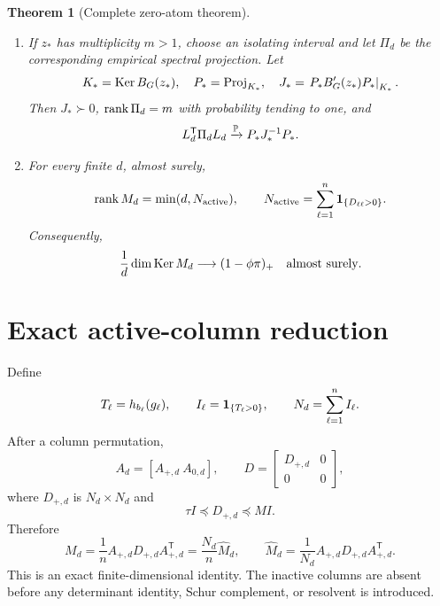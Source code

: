 \documentclass[
  aps,
  prl,
  10pt,
  onecolumn,
  longbibliography,
  nofootinbib
]{revtex4-2}
\newtheorem{theorem}{Theorem}
\theoremstyle{remark}
\begin{document}
\begin{theorem}[Complete zero-atom theorem]
\begin{enumerate}
\item If $z_*$ has multiplicity $m>1$, choose an isolating interval and let $\Pi_d$ be the corresponding empirical spectral projection. Let
\begin{equation}
K_*=\operatorname{Ker} B_G(z_*),\quad P_*=\operatorname{Proj}_{K_*},\quad
J_*=\left.P_*B_G'(z_*)P_*\right|_{K_*}.
\end{equation}
Then $J_*\succ0$, $\operatorname{rank}\Pi_d=m$ with probability tending to one, and
\begin{equation}
L_d^{\mathsf T}\Pi_dL_d
\xrightarrow{\mathbb{P}}P_*J_*^{-1}P_*.
\label{S:projection}
\end{equation}

\item For every finite $d$, almost surely,
\begin{equation}
\operatorname{rank} M_d=\min(d,N_{\mathrm{active}}),\qquad
N_{\mathrm{active}}=\sum_{\ell=1}^n\mathbf{1}_{\{D_{\ell\ell}>0\}}.
\label{S:rank}
\end{equation}
Consequently,
\begin{equation}
\frac1d\dim\operatorname{Ker} M_d\longrightarrow(1-\phi\pi)_+
\quad\text{almost surely}.
\label{S:nullity}
\end{equation}
\end{enumerate}
\end{theorem}

\section{Exact active-column reduction}

Define
\begin{equation}
T_\ell=h_{b_\ell}(g_\ell),\qquad
I_\ell=\mathbf{1}_{\{T_\ell>0\}},\qquad
N_d=\sum_{\ell=1}^nI_\ell .
\end{equation}
After a column permutation,
\begin{equation}
A_d=[A_{+,d}\ A_{0,d}],\qquad
D=\begin{bmatrix}D_{+,d}&0\\0&0\end{bmatrix},
\end{equation}
where $D_{+,d}$ is $N_d\times N_d$ and
\begin{equation}
\tau I\preceq D_{+,d}\preceq MI.
\end{equation}
Therefore
\begin{equation}
M_d
=\frac1nA_{+,d}D_{+,d}A_{+,d}^{\mathsf T}
=\frac{N_d}{n}\widehat M_d,
\qquad
\widehat M_d=
\frac1{N_d}A_{+,d}D_{+,d}A_{+,d}^{\mathsf T}.
\label{S:activeidentity}
\end{equation}
This is an exact finite-dimensional identity. The inactive columns are absent before any determinant identity, Schur complement, or resolvent is introduced.
\end{document}
